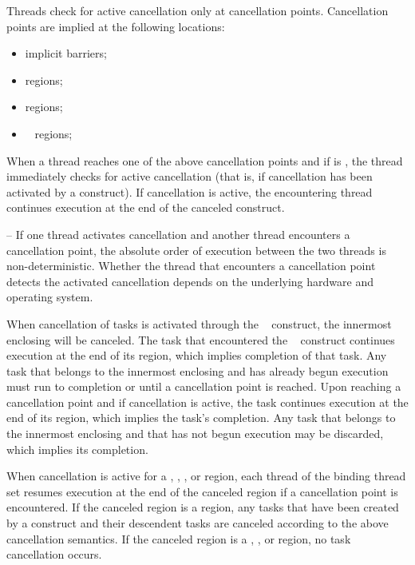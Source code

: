 Threads check for active cancellation only at cancellation points. Cancellation points are 
implied at the following locations:

\begin{itemize}
\setlength\itemindent{2em}
\item implicit barriers;
\item {} regions;
\item {} regions; 
\item {}~ regions;
\end{itemize}

When a thread reaches one of the above cancellation points and if  is , 
the thread immediately checks for active cancellation (that is, if cancellation has been 
activated by a  construct). If cancellation is active, the encountering thread 
continues execution at the end of the canceled construct.

\notestart
\noteheader – If one thread activates cancellation and another thread encounters a cancellation 
point, the absolute order of execution between the two threads is non-deterministic. 
Whether the thread that encounters a cancellation point detects the activated cancellation 
depends on the underlying hardware and operating system.
\noteend

When cancellation of tasks is activated through the ~ construct, the 
innermost enclosing  will be canceled. The task that encountered the 
~ construct continues execution at the end of its  region, 
which implies completion of that task. Any task that belongs to the innermost enclosing 
 and has already begun execution must run to completion or until a 
cancellation point is reached. Upon reaching a cancellation point and if cancellation is active, the task continues execution at the end of its  region, which implies the task's completion. Any task that belongs to the innermost enclosing  and that 
has not begun execution may be discarded, which implies its completion.

When cancellation is active for a , , , or  region, each 
thread of the binding thread set resumes execution at the end of the canceled region if a 
cancellation point is encountered. If the canceled region is a  region, any 
tasks that have been created by a  construct and their descendent tasks are 
canceled according to the above  cancellation semantics. If the canceled 
region is a , , or  region, no task cancellation occurs.

